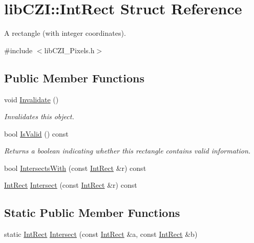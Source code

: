 \hypertarget{structlib_c_z_i_1_1_int_rect}{}\section{lib\+C\+ZI\+:\+:Int\+Rect Struct Reference}
\label{structlib_c_z_i_1_1_int_rect}


A rectangle (with integer coordinates).  




{\ttfamily \#include $<$lib\+C\+Z\+I\+\_\+\+Pixels.\+h$>$}

\subsection*{Public Member Functions}
\begin{DoxyCompactItemize}
\item 
\mbox{\label{structlib_c_z_i_1_1_int_rect_ae9c4747389326efa22ba0ab98a15359b}} 
void \hyperlink{structlib_c_z_i_1_1_int_rect_ae9c4747389326efa22ba0ab98a15359b}{Invalidate} ()
\begin{DoxyCompactList}\small\item\em Invalidates this object. \end{DoxyCompactList}\item 
\mbox{\label{structlib_c_z_i_1_1_int_rect_adcabd2e773bd9277a5e30b7c41d90d13}} 
bool \hyperlink{structlib_c_z_i_1_1_int_rect_adcabd2e773bd9277a5e30b7c41d90d13}{Is\+Valid} () const
\begin{DoxyCompactList}\small\item\em Returns a boolean indicating whether this rectangle contains valid information. \end{DoxyCompactList}\item 
bool \hyperlink{structlib_c_z_i_1_1_int_rect_a7f1f1d29e2b43f840dd81584ae15bb15}{Intersects\+With} (const \hyperlink{structlib_c_z_i_1_1_int_rect}{Int\+Rect} \&r) const
\item 
\hyperlink{structlib_c_z_i_1_1_int_rect}{Int\+Rect} \hyperlink{structlib_c_z_i_1_1_int_rect_a705db72d07819bb7dc89de8e85a695e1}{Intersect} (const \hyperlink{structlib_c_z_i_1_1_int_rect}{Int\+Rect} \&r) const
\end{DoxyCompactItemize}
\subsection*{Static Public Member Functions}
\begin{DoxyCompactItemize}
\item 
static \hyperlink{structlib_c_z_i_1_1_int_rect}{Int\+Rect} \hyperlink{structlib_c_z_i_1_1_int_rect_ab90921fdce94ba493985e125fdb32d39}{Intersect} (const \hyperlink{structlib_c_z_i_1_1_int_rect}{Int\+Rect} \&a, const \hyperlink{structlib_c_z_i_1_1_int_rect}{Int\+Rect} \&b)
\end{DoxyCompactItemize}
